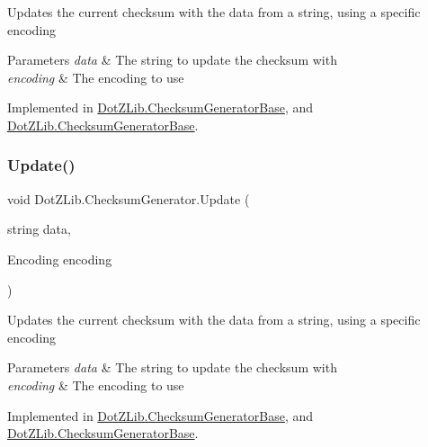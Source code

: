 Updates the current checksum with the data from a string, using a specific encoding 


\begin{DoxyParams}{Parameters}
{\em data} & The string to update the checksum with\\
\hline
{\em encoding} & The encoding to use\\
\hline
\end{DoxyParams}


Implemented in \hyperlink{class_dot_z_lib_1_1_checksum_generator_base_ad8e1adfbbfcc12ab74c772f3292bfee3}{Dot\+Z\+Lib.\+Checksum\+Generator\+Base}, and \hyperlink{class_dot_z_lib_1_1_checksum_generator_base_ad8e1adfbbfcc12ab74c772f3292bfee3}{Dot\+Z\+Lib.\+Checksum\+Generator\+Base}.

\mbox{\label{interface_dot_z_lib_1_1_checksum_generator_ab894f35764ea30031c616517a6a00391}} 
\subsubsection{\texorpdfstring{Update()}{Update()}\hspace{0.1cm}{\footnotesize\ttfamily [8/8]}}
{\footnotesize\ttfamily void Dot\+Z\+Lib.\+Checksum\+Generator.\+Update (\begin{DoxyParamCaption}\item[{string}]{data,  }\item[{Encoding}]{encoding }\end{DoxyParamCaption})}



Updates the current checksum with the data from a string, using a specific encoding 


\begin{DoxyParams}{Parameters}
{\em data} & The string to update the checksum with\\
\hline
{\em encoding} & The encoding to use\\
\hline
\end{DoxyParams}


Implemented in \hyperlink{class_dot_z_lib_1_1_checksum_generator_base_ad8e1adfbbfcc12ab74c772f3292bfee3}{Dot\+Z\+Lib.\+Checksum\+Generator\+Base}, and \hyperlink{class_dot_z_lib_1_1_checksum_generator_base_ad8e1adfbbfcc12ab74c772f3292bfee3}{Dot\+Z\+Lib.\+Checksum\+Generator\+Base}.



